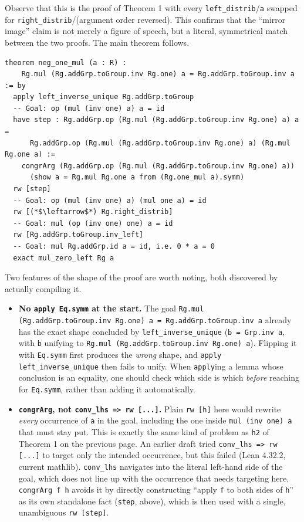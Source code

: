 Observe that this is the proof of Theorem 1 with every \texttt{left\_\allowbreak{}distrib}/\texttt{a} swapped for \texttt{right\_\allowbreak{}distrib}/(argument order reversed). This confirms that the ``mirror image'' claim is not merely a figure of speech, but a literal, symmetrical match between the two proofs. The main theorem follows.

\begin{lstlisting}
theorem neg_one_mul (a : R) :
    Rg.mul (Rg.addGrp.toGroup.inv Rg.one) a = Rg.addGrp.toGroup.inv a := by
  apply left_inverse_unique Rg.addGrp.toGroup
  -- Goal: op (mul (inv one) a) a = id
  have step : Rg.addGrp.op (Rg.mul (Rg.addGrp.toGroup.inv Rg.one) a) a =
      Rg.addGrp.op (Rg.mul (Rg.addGrp.toGroup.inv Rg.one) a) (Rg.mul Rg.one a) :=
    congrArg (Rg.addGrp.op (Rg.mul (Rg.addGrp.toGroup.inv Rg.one) a))
      (show a = Rg.mul Rg.one a from (Rg.one_mul a).symm)
  rw [step]
  -- Goal: op (mul (inv one) a) (mul one a) = id
  rw [(*$\leftarrow$*) Rg.right_distrib]
  -- Goal: mul (op (inv one) one) a = id
  rw [Rg.addGrp.toGroup.inv_left]
  -- Goal: mul Rg.addGrp.id a = id, i.e. 0 * a = 0
  exact mul_zero_left Rg a
\end{lstlisting}

Two features of the shape of the proof are worth noting, both discovered by actually compiling it.

\begin{itemize}
\tightlist
\item
  \textbf{No \texttt{apply Eq.symm} at the start.} The goal \texttt{Rg.mul (Rg.addGrp.toGroup.inv Rg.one) a = Rg.addGrp.toGroup.inv a} already has the exact shape concluded by \texttt{left\_\allowbreak{}inverse\_\allowbreak{}unique} (\texttt{b = Grp.inv a}, with \texttt{b} unifying to \texttt{Rg.mul (Rg.addGrp.toGroup.inv Rg.one) a}). Flipping it with \texttt{Eq.symm} first produces the \emph{wrong} shape, and \texttt{apply left\_\allowbreak{}inverse\_\allowbreak{}unique} then fails to unify. When \texttt{apply}ing a lemma whose conclusion is an equality, one should check which side is which \emph{before} reaching for \texttt{Eq.symm}, rather than adding it automatically.
\item
  \textbf{\texttt{congrArg}, not \texttt{conv\_\allowbreak{}lhs => rw [...]}.} Plain \texttt{rw [h]} here would rewrite \emph{every} occurrence of \texttt{a} in the goal, including the one inside \texttt{mul (inv one) a} that must stay put. This is exactly the same kind of problem as \texttt{h2} of Theorem 1 on the previous page. An earlier draft tried \texttt{conv\_\allowbreak{}lhs => rw [...]} to target only the intended occurrence, but this failed (Lean 4.32.2, current mathlib). \texttt{conv\_\allowbreak{}lhs} navigates into the literal left-hand side of the goal, which does not line up with the occurrence that needs targeting here. \texttt{congrArg f h} avoids it by directly constructing ``apply \texttt{f} to both sides of \texttt{h}'' as its own standalone fact (\texttt{step}, above), which is then used with a single, unambiguous \texttt{rw [step]}.
\end{itemize}

